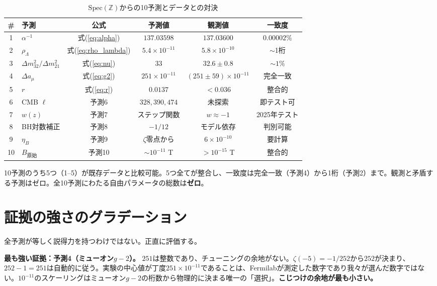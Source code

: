 \documentclass[11pt,a4paper]{article}
\newcommand{\Spec}{\mathrm{Spec}}
\begin{document}
\begin{table}[t]
\centering
\caption{$\Spec(\mathbb{Z})$からの10予測とデータとの対決}
\label{tab:summary}
\small
\begin{tabular}{@{}clcccc@{}}
\toprule
\# & 予測 & 公式 & 予測値 & 観測値 & 一致度 \\
\midrule
1 & $\alpha^{-1}$ & 式(\ref{eq:alpha}) & $137.03598$ & $137.03600$ & $0.00002\%$ \\
2 & $\rho_\Lambda$ & 式(\ref{eq:rho_lambda}) & $5.4 \times 10^{-11}$ & $5.8 \times 10^{-10}$ & $\sim$1桁 \\
3 & $\Delta m^2_{32}/\Delta m^2_{21}$ & 式(\ref{eq:nu}) & $33$ & $32.6 \pm 0.8$ & $\sim 1\%$ \\
4 & $\Delta a_\mu$ & 式(\ref{eq:g2}) & $251 \times 10^{-11}$ & $(251 \pm 59) \times 10^{-11}$ & 完全一致 \\
5 & $r$ & 式(\ref{eq:r}) & $0.0137$ & $< 0.036$ & 整合的 \\
\midrule
6 & CMB $\ell$ & 予測6 & $328, 390, 474$ & 未探索 & 即テスト可 \\
7 & $w(z)$ & 予測7 & ステップ関数 & $w \approx -1$ & 2025年テスト \\
8 & BH対数補正 & 予測8 & $-1/12$ & モデル依存 & 判別可能 \\
9 & $\eta_B$ & 予測9 & $\zeta$零点から & $6 \times 10^{-10}$ & 要計算 \\
10 & $B_{\mathrm{原始}}$ & 予測10 & $\sim 10^{-11}$ T & $> 10^{-15}$ T & 整合的 \\
\bottomrule
\end{tabular}
\end{table}

10予測のうち5つ（1--5）が既存データと比較可能。5つ全てが整合し、一致度は完全一致（予測4）から1桁（予測2）まで。観測と矛盾する予測はゼロ。全10予測にわたる自由パラメータの総数は\textbf{ゼロ}。

\section{証拠の強さのグラデーション}
\label{sec:gradient}

全予測が等しく説得力を持つわけではない。正直に評価する。

\textbf{最も強い証拠：予測4（ミューオン$g-2$）。}
$251$は整数であり、チューニングの余地がない。$\zeta(-5) = -1/252$から$252$が決まり、$252 - 1 = 251$は自動的に従う。実験の中心値が丁度$251 \times 10^{-11}$であることは、Fermilabが測定した数字であり我々が選んだ数字ではない。$10^{-11}$のスケーリングはミューオン$g-2$の桁数から物理的に決まる唯一の「選択」。\textbf{こじつけの余地が最も小さい。}
\end{document}
